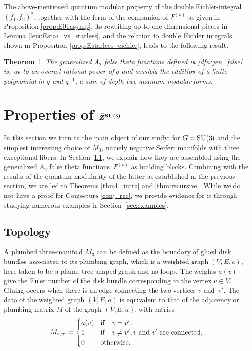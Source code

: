 \documentclass[10pt,a4paper]{amsart}
\def\bv{{\vec{\underline{b}}}}
\newtheorem{thm}{Theorem}[section]
\theoremstyle{definition}
\numberwithin{equation}{section}
\begin{document}
The above-mentioned quantum modular property of the double Eichler-integral $(f_1,f_2)^\ast$, together with the form of the companion of $F^{(\rho)}$ as given in Proposition \ref{prop:E01asymp}, its rewriting up to one-dimensional pieces in Lemma \ref{lem:Estar_vs_starless}, and the relation to double Eichler integrals shown in Proposition \ref{prop:Estarless_eichler}, leads to the following result.
\begin{thm}
 The generalized $A_2$ false theta functions defined in \eqref{dfn:gen_false} is, up to an overall rational power of $q$ and possibly the addition of a finite polynomial in $q$ and $q^{-1}$, a sum of depth two quantum modular forms.
\end{thm}

\section[Properties of Z\^{}\{SU(3)\}]{Properties of $\boldsymbol{\widehat{Z}^{{\rm SU}(3)}}$}\label{sec:Zhat}

In this section we turn to the main object of our study: \smash{$\widehat Z^{G}_\bv(M_3)$} for $G={\rm SU}(3)$ and the simplest interesting choice of $M_3$, namely negative Seifert manifolds with three exceptional fibers. In Section~\ref{subsec:topology}, we explain how they are assembled using the generalized $A_2$ false theta functions~$F^{(\rho)}$ as building blocks. Combining with the results of the quantum modularity of the latter as established in the previous section, we are led to Theorems \ref{thm1_intro} and \ref{thm:recursive}. While we do not have a proof for Conjecture \ref{conj_rec}, we provide evidence for it through studying numerous examples in Section~\ref{sec:examples}.




\subsection{Topology}
\label{subsec:topology}

A plumbed three-manifold $M_3$ can be defined
as the boundary of glued disk bundles
associated to its plumbing graph, which is a weighted graph $(V,E,a)$, here taken to be a planar tree-shaped graph and no loops. The weights $a(v)$ give the Euler number of the disk bundle corresponding to the vertex $v\in V$.
Gluing occurs when there is an edge connecting the two vertices $v$ and~$v' $.
 The data of the weighted graph $(V,E,a)$ is equivalent to that of the adjacency or plumbing matrix $M$ of the graph $(V,E,a)$, with entries
\begin{equation}\label{adjacencymatrix}
 M_{v,v' }=\begin{cases}
 a(v) & \mathrm{if}\quad v=v', \\
 1 & {\mathrm{if}}\quad v\neq v', v {\rm ~and~} v' {\rm ~are~connected}, \\
 0 & \mathrm{otherwise} .
 \end{cases}
\end{equation}
\end{document}

